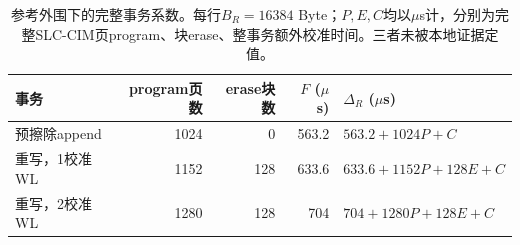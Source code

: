 \begin{table}[htbp]\centering\small
\begin{tabular}{@{}lrrrl@{}}\toprule
事务 & program页数 & erase块数 & $F$ ($\mu$s) & $\Delta_R$ ($\mu$s)\\\midrule
预擦除append & 1024 & 0 & 563.2 & $563.2+1024P+C$\\
重写，1校准WL & 1152 & 128 & 633.6 & $633.6+1152P+128E+C$\\
重写，2校准WL & 1280 & 128 & 704 & $704+1280P+128E+C$\\
\bottomrule\end{tabular}
\caption{参考外围下的完整事务系数。每行$B_R=16384$ Byte；$P,E,C$均以$\mu$s计，分别为完整SLC-CIM页program、块erase、整事务额外校准时间。三者未被本地证据定值。}
\label{tab:coeff}\end{table}

